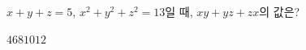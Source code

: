 $x+y+z=5$, $x^2+y^2+z^2=13$일 때, $xy+yz+zx$의 값은?
\begin{choices32}{$4$}{$6$}{$8$}{$10$}{$12$}\end{choices32}

